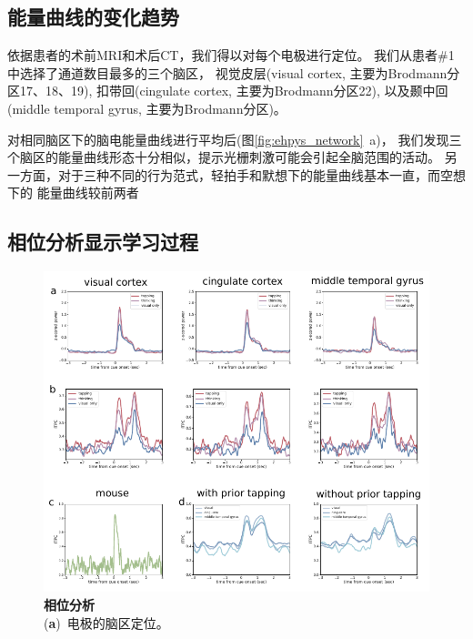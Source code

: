 \subsection{能量曲线的变化趋势}
依据患者的术前MRI和术后CT，我们得以对每个电极进行定位。
我们从患者\#1中选择了通道数目最多的三个脑区，
视觉皮层(visual cortex, 主要为Brodmann分区17、18、19),
扣带回(cingulate cortex, 主要为Brodmann分区22), %
以及颞中回(middle temporal gyrus, 主要为Brodmann分区)。%

对相同脑区下的脑电能量曲线进行平均后(图\ref{fig:ehpys_network}~a)，
我们发现三个脑区的能量曲线形态十分相似，提示光栅刺激可能会引起全脑范围的活动。
另一方面，对于三种不同的行为范式，轻拍手和默想下的能量曲线基本一直，而空想下的
能量曲线较前两者

\subsection{相位分析显示学习过程}

\begin{figure}[h]
    \centering
    \includegraphics[width=\textwidth]{src/figures/ephys_network.pdf}
    \caption{\textbf{相位分析}\\
    (\textbf{a})~电极的脑区定位。}
    \label{fig:ephys_network}
\end{figure}

